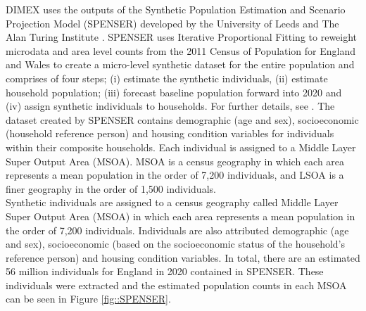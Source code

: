 \documentclass{article}
\begin{document}
\noindent DIMEX uses the outputs of the Synthetic Population Estimation and Scenario Projection Model (SPENSER) developed by the University of Leeds and The Alan Turing Institute \citep{ATI}.  SPENSER uses Iterative Proportional Fitting \citep{lovelace2015evaluating} to reweight microdata and area level counts from the 2011 Census of Population for England and Wales to create a micro-level synthetic dataset for the entire population and comprises of four steps; (i) estimate the synthetic individuals, (ii) estimate household population; (iii) forecast baseline population forward into 2020 and (iv) assign synthetic individuals to households. For further details, see \citep{lomax2017microsimulation, smith2018ukpopulation}.  The dataset created by SPENSER contains demographic (age and sex), socioeconomic (household reference person) and housing condition variables for individuals within their composite households. Each individual is assigned to a Middle Layer Super Output Area (MSOA). MSOA is a census geography in which each area represents a mean population in the order of 7,200 individuals, and LSOA is a finer geography in the order of 1,500 individuals.\\

\noindent Synthetic individuals are assigned to a census geography called Middle Layer Super Output Area (MSOA) in which each area represents a mean population in the order of 7,200 individuals. Individuals are also attributed demographic (age and sex), socioeconomic (based on the socioeconomic status of the household's reference person) and housing condition variables. In total, there are an estimated 56 million individuals for England in 2020 contained in SPENSER. These individuals were extracted and the estimated population counts in each MSOA can be seen in Figure \ref{fig::SPENSER}. \\
\end{document}
